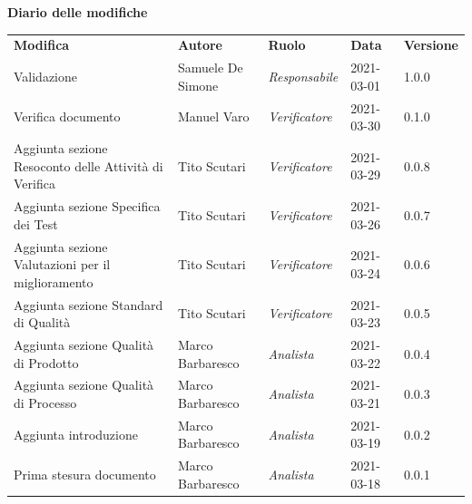 \documentclass[a4paper]{article}
\begin{document}
\begin{center}
    \textbf{\Large Diario delle modifiche}\\
    \vspace{10px}
    \begin{table}[h!]
        \centering
        \renewcommand{\arraystretch}{1.8}
        \begin{tabular}{p{150px} p{90px} p{60px} p{60px} p{45px}}
            \rowcolor{logo!70} \textbf{Modifica}                  & \textbf{Autore}   & \textbf{Ruolo} & \textbf{Data} & \textbf{Versione} \\
            Validazione                                           & Samuele De Simone & \textit{Responsabile}   & 2021-03-01    & 1.0.0             \\
            Verifica documento                                    & Manuel Varo       & \textit{Verificatore}   & 2021-03-30    & 0.1.0             \\
            Aggiunta sezione Resoconto delle Attività di Verifica & Tito Scutari      & \textit{Verificatore}   & 2021-03-29    & 0.0.8             \\
            Aggiunta sezione Specifica dei Test                   & Tito Scutari      & \textit{Verificatore}   & 2021-03-26    & 0.0.7             \\
            Aggiunta sezione Valutazioni per il miglioramento     & Tito Scutari      & \textit{Verificatore}   & 2021-03-24    & 0.0.6             \\
            Aggiunta sezione Standard di Qualità                  & Tito Scutari      & \textit{Verificatore}   & 2021-03-23    & 0.0.5             \\
            Aggiunta sezione Qualità di Prodotto                  & Marco Barbaresco  & \textit{Analista}       & 2021-03-22    & 0.0.4             \\
            Aggiunta sezione Qualità di Processo                  & Marco Barbaresco  & \textit{Analista}       & 2021-03-21    & 0.0.3             \\
            Aggiunta introduzione                                 & Marco Barbaresco  & \textit{Analista}       & 2021-03-19    & 0.0.2             \\
            Prima stesura documento                               & Marco Barbaresco  & \textit{Analista}       & 2021-03-18    & 0.0.1             \\
        \end{tabular}
    \end{table}
\end{center}

\newpage
\tableofcontents
\newpage
\newpage
\listoftables
\newpage




\appendix



\end{document}
